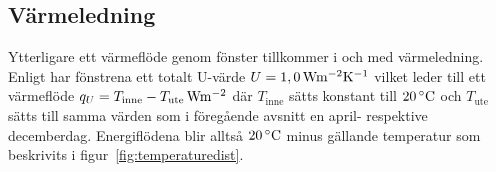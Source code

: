 \subsection{Värmeledning}

Ytterligare ett värmeflöde genom fönster tillkommer i och med värmeledning. Enligt \cite{petersarneo} har fönstrena ett totalt U-värde $U=\unit[1,0]{Wm^{-2}K^{-1}}$ vilket leder till ett värmeflöde $q_{U}=\unit[T_\text{inne}-T_\text{ute}]{Wm^{-2}}$ där $T_\text{inne}$ sätts konstant till $\unit[20]{^{\circ}C}$ och $T_\text{ute}$ sätts till samma värden som i föregående avsnitt en april- respektive decemberdag. Energiflödena blir alltså $\unit[20]{^{\circ}C}$ minus gällande temperatur som beskrivits i figur~\ref{fig:temperaturedist}.

